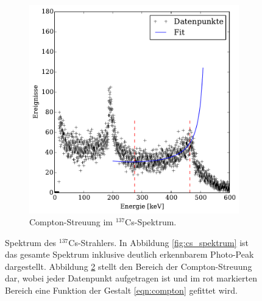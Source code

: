 \begin{figure}[htb]
\begin{subfigure}{0.49\linewidth}
        \includegraphics[width=1.0\linewidth]{img/06_caesium_zoomed.pdf}
        \caption{
            Compton-Streuung im $^{137}$Cs-Spektrum.
        }
        \label{fig:cs_spektrum_zoom}
    \end{subfigure}
    \caption{
        Spektrum des $^{137}$Cs-Strahlers. In Abbildung \ref{fig:cs_spektrum} ist das gesamte Spektrum inklusive deutlich erkennbarem Photo-Peak dargestellt.
        Abbildung \ref{fig:cs_spektrum_zoom} stellt den Bereich der Compton-Streuung dar, wobei jeder Datenpunkt aufgetragen ist und im rot markierten Bereich eine Funktion der Gestalt \eqref{eqn:compton} gefittet wird.
    }
\end{figure}

